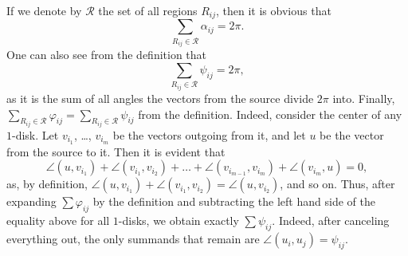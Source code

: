 
If we denote by $\mathcal{R}$ the set of all regions $R_{ij}$, then it is obvious that $$\sum_{R_{ij}\in\mathcal{R}}\alpha_{ij} = 2\pi.$$ One can also see from the definition that $$\sum_{R_{ij}\in\mathcal{R}}\psi_{ij} = 2\pi,$$ as it is the sum of all angles the vectors from the source divide $2\pi$ into. Finally, $\sum_{R_{ij}\in\mathcal{R}}\varphi_{ij} = \sum_{R_{ij}\in\mathcal{R}}\psi_{ij}$ from the definition. Indeed, consider the center of any $1$-disk. Let $v_{i_1}$, \ldots, $v_{i_m}$ be the vectors outgoing from it, and let $u$ be the vector from the source to it. Then it is evident that
$$\angle(u, v_{i_1}) + \angle(v_{i_1}, v_{i_2}) + \ldots + \angle(v_{i_{m-1}}, v_{i_m}) + \angle(v_{i_m}, u) = 0,$$
as, by definition, $\angle(u, v_{i_1}) + \angle(v_{i_1}, v_{i_2}) = \angle(u, v_{i_2})$, and so on.
Thus, after expanding $\sum\varphi_{ij}$ by the definition and subtracting the left hand side of the equality above for all $1$-disks, we obtain exactly $\sum\psi_{ij}$. Indeed, after canceling everything out, the only summands that remain are $\angle(u_i, u_j) = \psi_{ij}$.

